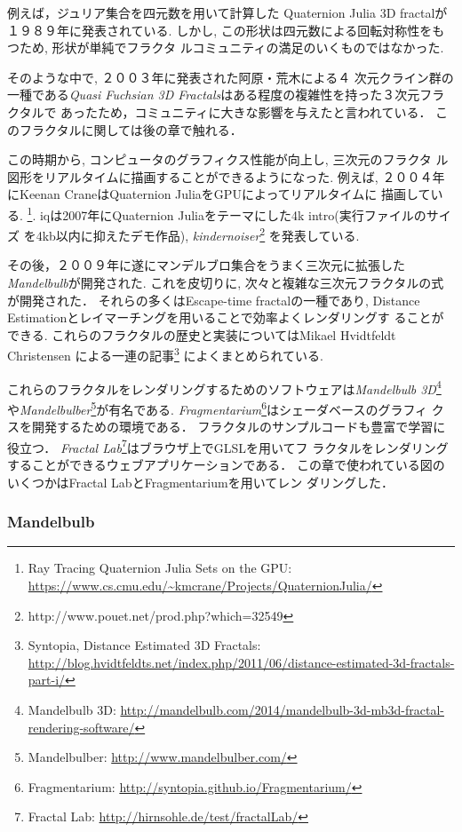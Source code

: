 例えば，ジュリア集合を四元数を用いて計算した
Quaternion Julia 3D fractal\cite{4djulia}が１９８９年に発表されている.
しかし, この形状は四元数による回転対称性をもつため, 形状が単純でフラクタ
ルコミュニティの満足のいくものではなかった.

そのような中で, ２００３年に発表された阿原・荒木による４
次元クライン群の一種である{\it Quasi Fuchsian 3D
Fractals}\cite{sphairahedra}はある程度の複雑性を持った３次元フラクタルで
あったため，コミュニティに大きな影響を与えたと言われている．
このフラクタルに関しては後の章で触れる．

この時期から, コンピュータのグラフィクス性能が向上し, 三次元のフラクタ
ル図形をリアルタイムに描画することができるようになった.
例えば, ２００４年にKeenan CraneはQuaternion JuliaをGPUによってリアルタイムに
描画している. \footnote{Ray Tracing Quaternion Julia Sets on
the GPU:
\url{https://www.cs.cmu.edu/~kmcrane/Projects/QuaternionJulia/}}.
iqは2007年にQuaternion Juliaをテーマにした4k intro(実行ファイルのサイズ
を4kb以内に抑えたデモ作品),
\textit{kindernoiser}\footnote{http://www.pouet.net/prod.php?which=32549}
を発表している.

その後，２００９年に遂にマンデルブロ集合をうまく三次元に拡張した{\it
Mandelbulb}が開発された.
これを皮切りに, 次々と複雑な三次元フラクタルの式が開発された．
それらの多くはEscape-time fractalの一種であり,
Distance Estimationとレイマーチングを用いることで効率よくレンダリングす
ることができる.
これらのフラクタルの歴史と実装についてはMikael Hvidtfeldt Christensen
による一連の記事\footnote{Syntopia, Distance Estimated 3D
Fractals:\\ \quad \quad
\url{http://blog.hvidtfeldts.net/index.php/2011/06/distance-estimated-3d-fractals-part-i/}}
によくまとめられている.

これらのフラクタルをレンダリングするためのソフトウェアは{\it Mandelbulb
3D}\footnote{Mandelbulb 3D:
\url{http://mandelbulb.com/2014/mandelbulb-3d-mb3d-fractal-rendering-software/}}
や{\it Mandelbulber}\footnote{Mandelbulber:
\url{http://www.mandelbulber.com/}}が有名である.
{\it Fragmentarium}\footnote{Fragmentarium:
\url{http://syntopia.github.io/Fragmentarium/}}はシェーダベースのグラフィ
クスを開発するための環境である．
フラクタルのサンプルコードも豊富で学習に役立つ．
{\it Fractal Lab}\footnote{Fractal Lab:
\url{http://hirnsohle.de/test/fractalLab/}}はブラウザ上でGLSLを用いてフ
ラクタルをレンダリングすることができるウェブアプリケーションである．
この章で使われている図のいくつかはFractal LabとFragmentariumを用いてレン
ダリングした．

\subsubsection{Mandelbulb}

